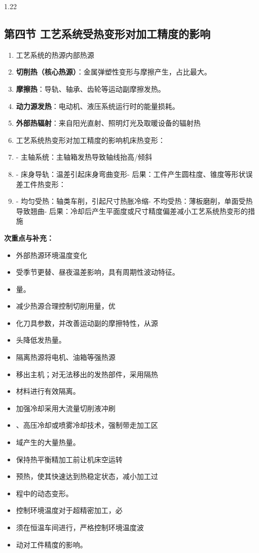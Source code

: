 \documentclass[12pt,a4paper]{article}
\begin{document}
\begin{spacing}{1.22}
\subsection{第四节 工艺系统受热变形对加工精度的影响}
\begin{tcolorbox}[colback=yellow!6,colframe=red!55!black,title=重点,left=1mm,right=1mm]
\begin{enumerate}[leftmargin=2.2em,label=\arabic*.]
  \item 工艺系统的热源内部热源
  \item \textbf{切削热（核心热源）}：金属弹塑性变形与摩擦产生，占比最大。
  \item \textbf{摩擦热}：导轨、轴承、齿轮等运动副摩擦发热。
  \item \textbf{动力源发热}：电动机、液压系统运行时的能量损耗。
  \item \textbf{外部热辐射}：来自阳光直射、照明灯光及取暖设备的辐射热
  \item 工艺系统热变形对加工精度的影响机床热变形：
  \item - 主轴系统：主轴箱发热导致轴线抬高/倾斜
  \item - 床身导轨：温差引起床身弯曲变形- 后果：工件产生圆柱度、锥度等形状误差工件热变形：
  \item - 均匀受热：轴类车削，引起尺寸热胀冷缩- 不均受热：薄板磨削，单面受热导致翘曲- 后果：冷却后产生平面度或尺寸精度偏差减小工艺系统热变形的措施
\end{enumerate}
\end{tcolorbox}
\noindent\textbf{次重点与补充：}
\begin{itemize}[leftmargin=2.2em,label=--]
  \item 外部热源环境温度变化
  \item 受季节更替、昼夜温差影响，具有周期性波动特征。
  \item 量。
  \item 减少热源合理控制切削用量，优
  \item 化刀具参数，并改善运动副的摩擦特性，从源
  \item 头降低发热量。
  \item 隔离热源将电机、油箱等强热源
  \item 移出主机；对无法移出的发热部件，采用隔热
  \item 材料进行有效隔离。
  \item 加强冷却采用大流量切削液冲刷
  \item 、高压冷却或喷雾冷却技术，强制带走加工区
  \item 域产生的大量热量。
  \item 保持热平衡精加工前让机床空运转
  \item 预热，使其快速达到热稳定状态，减小加工过
  \item 程中的动态变形。
  \item 控制环境温度对于超精密加工，必
  \item 须在恒温车间进行，严格控制环境温度波
  \item 动对工件精度的影响。
\end{itemize}


\end{spacing}
\end{document}
